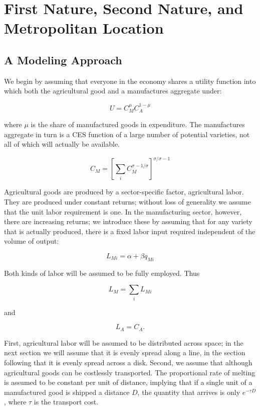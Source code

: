 \chapter{First Nature, Second Nature, and Metropolitan Location}

\section{A Modeling Approach}

We begin by assuming that everyone in the economy shares a utility function into which both the agricultural good and a manufactures aggregate under:

\begin{equation}
    U = C_M^{\mu} C_A^{1 - \mu}
\end{equation}

where $\mu$ is the share of manufactured goods in expenditure. The manufactures aggregate in turn is a CES function of a large number of potential varieties, not all of which will actually be available.

\begin{equation}
    C_M = \left[ \sum_i C_M^{\sigma - 1/ \sigma}\right]^{\sigma / \sigma - 1}
\end{equation}

Agricultural goods are produced by a sector-specific factor, agricultural labor. They are produced under constant returns; without loss of generality we assume that the unit labor requirement is one. In the manufacturing sector, however, there are increasing returns; we introduce these by assuming that for any variety that is actually produced, there is a fixed labor input required independent of the volume of output:

\begin{equation}
    L_{Mi} = \alpha + \beta q_{Mi}
\end{equation}

Both kinds of labor will be assumed to be fully employed. Thus

\begin{equation}
    L_M = \sum_i L_{Mi}
\end{equation}

and

\begin{equation}
    L_A = C_A.
\end{equation}

First, agricultural labor will be assumed to be distributed across space; in the next section we will assume that it is evenly spread along a line, in the section following that it is evenly spread across a disk. Second, we assume that although agricultural goods can be costlessly transported. The proportional rate of melting is assumed to be constant per unit of distance, implying that if a single unit of a manufactured good is shipped a distance $D$, the quantity that arrives is only $e^{-\tau D}$, where $\tau$ is the transport cost.


